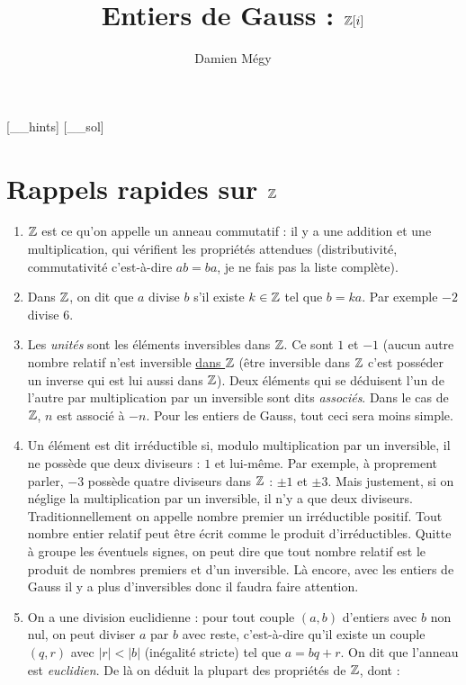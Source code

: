 





[_\jobname_hints]
[_\jobname_sol]


\title{Entiers de Gauss : $\mathbb Z[i]$}
\author{Damien Mégy}
\maketitle
\tableofcontents

\section{Rappels rapides sur $\mathbb Z$}
\begin{enumerate}
\item $\mathbb Z$ est ce qu'on appelle un anneau commutatif : il y a une addition et une multiplication, qui vérifient les propriétés attendues (distributivité, commutativité c'est-à-dire $ab=ba$, je ne fais pas la liste complète).
\item Dans $\mathbb Z$, on dit que $a$ divise $b$ s'il existe $k\in \mathbb Z$ tel que $b=ka$. Par exemple $-2$ divise $6$. 
\item Les \emph{unités} sont les éléments inversibles dans $\mathbb Z$. Ce sont $1$ et $-1$ (aucun autre nombre relatif n'est inversible \underline{dans $\mathbb Z$} (être inversible dans $\mathbb Z$ c'est posséder un inverse qui est lui aussi dans $\mathbb Z$). Deux éléments qui se déduisent l'un de l'autre par multiplication par un inversible sont dits \emph{associés}. Dans le cas de $\mathbb Z$, $n$ est associé à $-n$. Pour les entiers de Gauss, tout ceci sera moins simple.
\item Un élément est dit irréductible si, modulo multiplication par un inversible, il ne possède que deux diviseurs : $1$ et lui-même. Par exemple, à proprement parler, $-3$ possède quatre diviseurs dans $\mathbb Z$ : $\pm 1$ et $\pm 3$. Mais justement, si on néglige la multiplication par un inversible, il n'y a que deux diviseurs. Traditionnellement on appelle nombre premier un irréductible positif. Tout nombre entier relatif peut être écrit comme le produit d'irréductibles. Quitte à groupe les éventuels signes, on peut dire que tout nombre relatif est le produit de nombres premiers et d'un inversible. Là encore, avec les entiers de Gauss il y a plus d'inversibles donc il faudra faire attention.
\item On a une division euclidienne : pour tout couple $(a,b)$ d'entiers avec $b$ non nul, on peut diviser $a$ par $b$ avec reste, c'est-à-dire qu'il existe un couple $(q,r)$ avec $|r|<|b|$ (inégalité stricte) tel que $a=bq+r$. On dit que l'anneau est \emph{euclidien}. De là on déduit la plupart des propriétés de $\mathbb Z$, dont : 

\end{enumerate}
